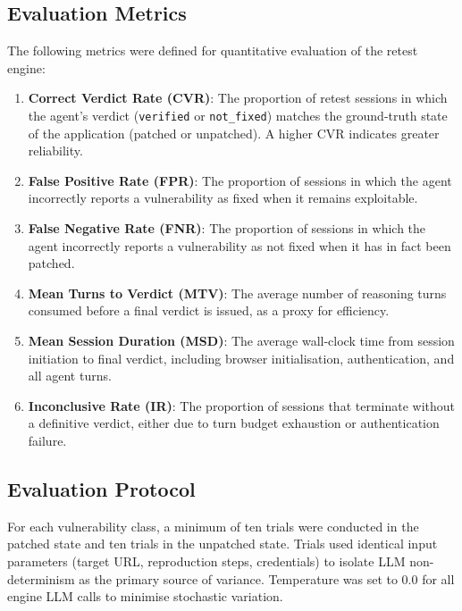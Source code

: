 \subsection{Evaluation Metrics}

The following metrics were defined for quantitative evaluation of the retest engine:

\begin{enumerate}
    \item \textbf{Correct Verdict Rate (CVR)}: The proportion of retest sessions in which the agent's verdict (\texttt{verified} or \texttt{not\_fixed}) matches the ground-truth state of the application (patched or unpatched). A higher CVR indicates greater reliability.

    \item \textbf{False Positive Rate (FPR)}: The proportion of sessions in which the agent incorrectly reports a vulnerability as fixed when it remains exploitable.

    \item \textbf{False Negative Rate (FNR)}: The proportion of sessions in which the agent incorrectly reports a vulnerability as not fixed when it has in fact been patched.

    \item \textbf{Mean Turns to Verdict (MTV)}: The average number of reasoning turns consumed before a final verdict is issued, as a proxy for efficiency.

    \item \textbf{Mean Session Duration (MSD)}: The average wall-clock time from session initiation to final verdict, including browser initialisation, authentication, and all agent turns.

    \item \textbf{Inconclusive Rate (IR)}: The proportion of sessions that terminate without a definitive verdict, either due to turn budget exhaustion or authentication failure.
\end{enumerate}

\subsection{Evaluation Protocol}

For each vulnerability class, a minimum of ten trials were conducted in the patched state and ten trials in the unpatched state. Trials used identical input parameters (target URL, reproduction steps, credentials) to isolate LLM non-determinism as the primary source of variance. Temperature was set to 0.0 for all engine LLM calls to minimise stochastic variation.


